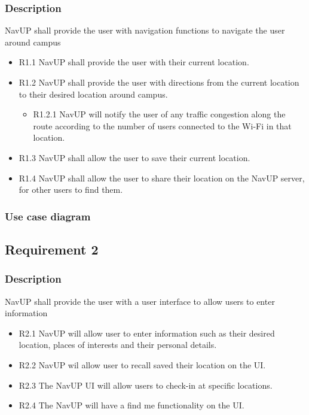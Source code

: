 \documentclass{article}
\begin{document}
    	\subsubsection{Description}
    	NavUP shall provide the user with navigation functions to navigate the user around campus
        \begin{itemize}
        \item R1.1 NavUP shall provide the user with their current location.
        \item R1.2 NavUP shall provide the user with directions from the current location to their desired location around campus.
            \begin{itemize}
                \item R1.2.1 NavUP will notify the user of any traffic congestion along the route according to the number of users connected to the Wi-Fi in that location.
            \end{itemize}
        \item R1.3 NavUP shall allow the user to save their current location.
        \item R1.4 NavUP shall allow the user to share their location on the NavUP server, for other users to find them.
        \end{itemize}
        \subsubsection{Use case diagram}
        \subsection{Requirement 2}
        \subsubsection{Description}
        NavUP shall provide the user with a user interface to allow users to enter information
        \begin{itemize}
        \item R2.1 NavUP will allow user to enter information such as their desired location, places of interests and their personal details.
        \item R2.2 NavUP wil allow user to recall saved their location on the UI.
        \item R2.3 The NavUP UI will allow users to check-in at specific locations.
        \item R2.4 The NavUP will have a find me functionality on the UI.
        \end{itemize}
\end{document}
